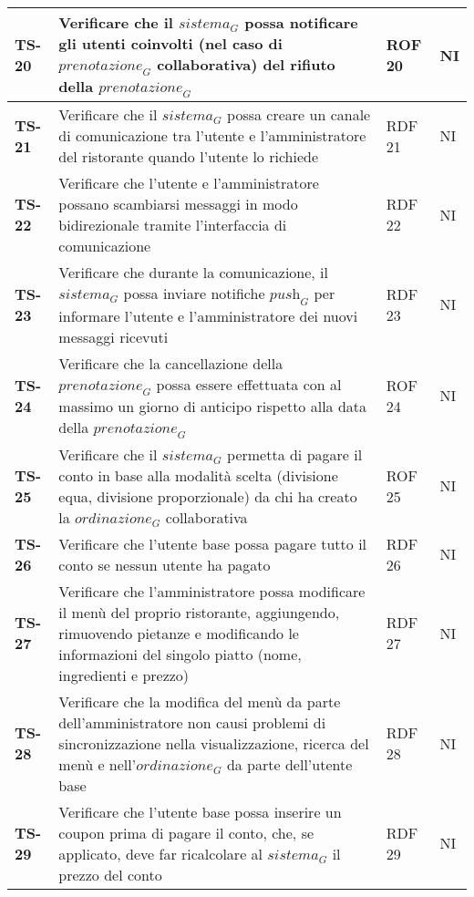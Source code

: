 \begin{longtable}{|>{\centering\arraybackslash}p{1.5cm}|p{12cm}|p{2cm}|p{1cm}|}
  \hline
  \rowcolor{gray!10}
  \textbf{TS-20} & Verificare che il $\textit{sistema}_G$ possa notificare gli utenti coinvolti (nel caso di $\textit{prenotazione}_G$ collaborativa) del rifiuto della $\textit{prenotazione}_G$ & ROF 20 & NI \\ 
  \hline
  \rowcolor{gray!10}
  \textbf{TS-21} & Verificare che il $\textit{sistema}_G$ possa creare un canale di comunicazione tra l'utente e l'amministratore del ristorante quando l'utente lo richiede & RDF 21 & NI \\
  \hline
  \rowcolor{gray!10}
  \textbf{TS-22} & Verificare che l'utente e l'amministratore possano scambiarsi messaggi in modo bidirezionale tramite l'interfaccia di comunicazione & RDF 22 & NI \\ 
  \hline 
  \rowcolor{gray!10}
  \textbf{TS-23} & Verificare che durante la comunicazione, il $\textit{sistema}_G$ possa inviare notifiche $\textit{push}_G$ per informare l'utente e l'amministratore dei nuovi messaggi ricevuti & RDF 23 & NI \\ 
  \hline
  \rowcolor{gray!10}
  \textbf{TS-24} & Verificare che la cancellazione della $\textit{prenotazione}_G$ possa essere effettuata con al massimo un giorno di anticipo rispetto alla data della $\textit{prenotazione}_G$ & ROF 24 & NI \\
  \hline
  \rowcolor{gray!10}
  \textbf{TS-25} & Verificare che il $\textit{sistema}_G$ permetta di pagare il conto in base alla modalità scelta (divisione equa, divisione proporzionale) da chi ha creato la $\textit{ordinazione}_G$ collaborativa & ROF 25 & NI \\
  \hline
  \rowcolor{gray!10}
  \textbf{TS-26} & Verificare che l'utente base possa pagare tutto il conto se nessun utente ha pagato & RDF 26 & NI \\
  \hline
  \rowcolor{gray!10}
  \textbf{TS-27} & Verificare che l'amministratore possa modificare il menù del proprio ristorante, aggiungendo, rimuovendo pietanze e modificando le informazioni del singolo piatto (nome, ingredienti e prezzo) & RDF 27 & NI \\
  \hline
  \rowcolor{gray!10}
  \textbf{TS-28} & Verificare che la modifica del menù da parte dell'amministratore non causi problemi di sincronizzazione nella visualizzazione, ricerca del menù e nell'$\textit{ordinazione}_G$ da parte dell'utente base & RDF 28 & NI \\ 
  \hline
  \rowcolor{gray!10}
  \textbf{TS-29} & Verificare che l'utente base possa inserire un coupon prima di pagare il conto, che, se applicato, deve far ricalcolare al $\textit{sistema}_G$ il prezzo del conto & RDF 29 & NI \\ 

\end{longtable}
